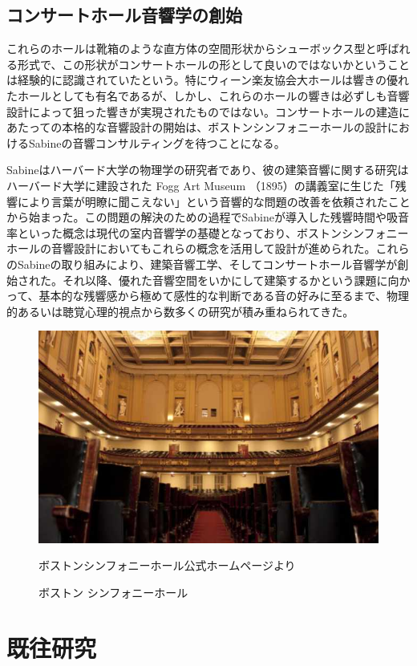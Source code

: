 \documentclass[11pt,a4j]{jreport}
\begin{document}
\newpage
\subsection*{コンサートホール音響学の創始}

これらのホールは靴箱のような直方体の空間形状からシューボックス型と呼ばれる形式で、この形状がコンサートホールの形として良いのではないかということは経験的に認識されていたという。特にウィーン楽友協会大ホールは響きの優れたホールとしても有名であるが、しかし、これらのホールの響きは必ずしも音響設計によって狙った響きが実現されたものではない。コンサートホールの建造にあたっての本格的な音響設計の開始は、ボストンシンフォニーホールの設計におけるSabineの音響コンサルティングを待つことになる\cite{清水寧2023}。

Sabineはハーバード大学の物理学の研究者であり、彼の建築音響に関する研究はハーバード大学に建設された Fogg Art Museum （1895）の講義室に生じた「残響により言葉が明瞭に聞こえない」という音響的な問題の改善を依頼されたことから始まった。この問題の解決のための過程でSabineが導入した残響時間や吸音率といった概念は現代の室内音響学の基礎となっており、ボストンシンフォニーホールの音響設計においてもこれらの概念を活用して設計が進められた。これらのSabineの取り組みにより、建築音響工学、そしてコンサートホール音響学が創始された\cite{sabine2005}。それ以降、優れた音響空間をいかにして建築するかという課題に向かって、基本的な残響感から極めて感性的な判断である音の好みに至るまで、物理的あるいは聴覚心理的視点から数多くの研究が積み重ねられてきた。

\vspace{1\baselineskip}

\begin{figure}[H]
  \centering
  \includegraphics[width=.45\linewidth]{images/pictureCitation/resized/bostonSymphony.jpg}
  \caption{ボストン シンフォニーホール}
  \label{fig:ボストンシンフォニーホール}
  \footnotesize ボストンシンフォニーホール公式ホームページより \cite{bostonSymphony}
\end{figure}

\newpage
\section{既往研究}
\end{document}
